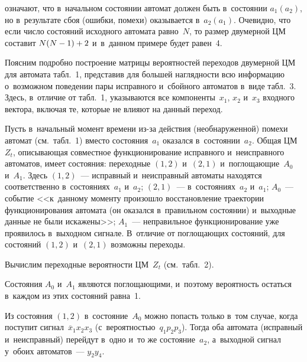 \begin{multicols}{2}
     

 
\noindent
 означают, что в~начальном состоянии автомат должен быть в~состоянии 
$a_1 (a_2)$, но в~результате сбоя (ошибки, помехи) оказывается в~$a_2 (a_1)$. 
Очевидно, что если число состояний исходного автомата равно~$N$, то размер 
двумерной ЦМ составит $N(N\hm-1) \hm+ 2$ и~в~данном примере будет 
равен~4.
     
     Поясним подробно построение матрицы вероятностей переходов 
двумерной ЦМ для автомата табл.~1, представив для большей наглядности всю 
информацию о~возможном поведении пары исправного и~сбойного автоматов 
в~виде табл.~3.
               Здесь, в~отличие от табл.~1, указываются все компоненты~$x_1$, $x_2$ 
и~$x_3$ входного вектора, включая те, которые не влияют на данный переход.
    
    Пусть в~начальный момент времени из-за действия (необнаруженной) 
помехи автомат (см.\ табл.~1) вместо состояния~$a_1$ оказался в~состоянии~$a_2$. 
Общая ЦМ~$Z_t$, описывающая совместное функционирование исправного 
и~неисправного автоматов, имеет состояния: переходные $(1,2)$ и~$(2,1)$ 
и~поглощающие~$A_0$ и~$A_1$. Здесь $(1,2)$~--- исправный и~неисправный 
автоматы находятся соответственно в~состояниях~$a_1$ и~$a_2$; $(2,1)$~--- 
в~состояниях~$a_2$ и~$a_1$; $A_0$~--- событие <<к~данному моменту 
произошло восстановление траектории функционирования автомата (он 
оказался в~правильном состоянии) и~выходные данные не были искажены>>;\linebreak 
$A_1$~--- неправильное функционирование уже проявилось в~выходном 
сигнале. В~отличие от поглощающих состояний, для состояний $(1,2)$ 
и~$(2,1)$ возможны переходы.
    
    Вычислим переходные вероятности ЦМ~$Z_t$ (см.\ табл.~2).
    
    Состояния $A_0$ и~$A_1$ являются поглощающими, и~поэтому 
вероятность остаться в~каждом из этих состояний равна~1. 
    
    Из состояния $(1,2)$ в~состояние~$A_0$ можно попасть только в~том 
случае, когда поступит сигнал~$\overline{x}_1x_2x_3$  
(с~ве\-ро\-ят\-ностью~$q_1p_2p_3$). Тогда оба автомата (исправный 
и~неисправный) перейдут в~одно и~то же состояние~$a_2$, а~выходной сигнал 
у~обоих автоматов~--- $y_2y_4$.
    

\end{multicols}
